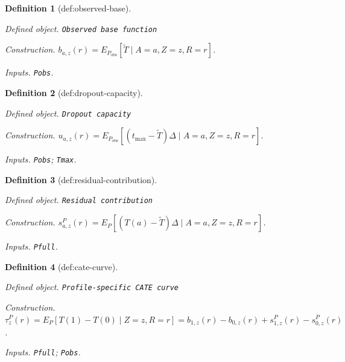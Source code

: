 \documentclass{article}
\newtheorem{definition}{Definition}
\begin{document}
\begin{definition}[def:observed-base]\label{def:observed-base}
\par\smallskip\noindent\emph{Defined object.} \texttt{Observed base function}
\par\smallskip\noindent\emph{Construction.} \(b_{a,z}(r)=E_{P_{\mathrm{obs}}}[\widetilde T\mid A=a,Z=z,R=r]\).
\par\smallskip\noindent\emph{Inputs.} \texttt{Pobs}.
\end{definition}

\begin{definition}[def:dropout-capacity]\label{def:dropout-capacity}
\par\smallskip\noindent\emph{Defined object.} \texttt{Dropout capacity}
\par\smallskip\noindent\emph{Construction.} \(u_{a,z}(r)=E_{P_{\mathrm{obs}}}[(t_{\max}-\widetilde T)\Delta\mid A=a,Z=z,R=r]\).
\par\smallskip\noindent\emph{Inputs.} \texttt{Pobs}; \texttt{Tmax}.
\end{definition}

\begin{definition}[def:residual-contribution]\label{def:residual-contribution}
\par\smallskip\noindent\emph{Defined object.} \texttt{Residual contribution}
\par\smallskip\noindent\emph{Construction.} \(s_{a,z}^{P}(r)=E_{P}[(T(a)-\widetilde T)\Delta\mid A=a,Z=z,R=r]\).
\par\smallskip\noindent\emph{Inputs.} \texttt{Pfull}.
\end{definition}

\begin{definition}[def:cate-curve]\label{def:cate-curve}
\par\smallskip\noindent\emph{Defined object.} \texttt{Profile-\allowbreak{}specific CATE curve}
\par\smallskip\noindent\emph{Construction.} \(\tau_z^{P}(r)=E_P[T(1)-T(0)\mid Z=z,R=r]=b_{1,z}(r)-b_{0,z}(r)+s_{1,z}^{P}(r)-s_{0,z}^{P}(r)\).
\par\smallskip\noindent\emph{Inputs.} \texttt{Pfull}; \texttt{Pobs}.
\end{definition}
\end{document}
